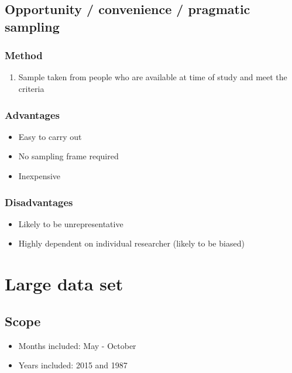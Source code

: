 \subsection{Opportunity / convenience / pragmatic sampling}
\subsubsection{Method}
\begin{enumerate}
    \item Sample taken from people who are available at time of study and meet the criteria
\end{enumerate}
\subsubsection{Advantages}
\begin{itemize}
    \item Easy to carry out
    \item No sampling frame required
    \item Inexpensive
\end{itemize}
\subsubsection{Disadvantages}
\begin{itemize}
    \item Likely to be unrepresentative
    \item Highly dependent on individual researcher (likely to be biased)
\end{itemize}

\section{Large data set}
\subsection{Scope}
\begin{itemize}
    \item Months included: May - October
    \item Years included: 2015 and 1987
\end{itemize}
